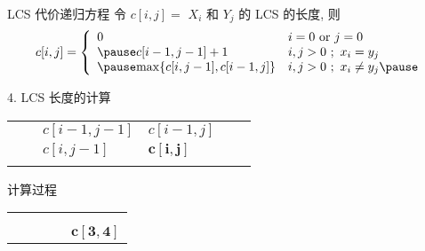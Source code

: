 \documentclass[fontset=fandol,UTF8,fleqn]{beamer}
\begin{document}
\begin{frame}{LCS 代价递归方程}
令 $c[i, j]=$ $X_i$ 和 $Y_j$ 的 LCS 的长度,  则 \pause
\begin{eqnarray*}
  \label{eq:lcs}
  c[i,j]=\left\{\begin{array}{ll}
0 &  i=0\ \textrm{or}\ j=0   \\ \pause
c[i-1,j-1]+1 &  i,j >0\ ;\ x_i=y_j   \\ \pause
\mathrm{max}\{c[i,j-1],c[i-1,j]\} &  i,j >0\
;\ x_i \neq y_j  \pause
\end{array}\right.
\end{eqnarray*}
\end{frame}

\begin{frame}{4. LCS 长度的计算}
\begin{table}
   \centering
   \begin{tabular}{ll|l|l|ll}
&  & & & &  \\
\hline
     &  & $c[i-1, j-1]$ & $c[i-1, j]$  & &     \\
\hline
&    & $c[i, j-1]$ & $\mathbf{c[i,j]}$ &  &   \\
\hline
& &  & &  \\
   \end{tabular}
 \end{table}
\end{frame}

\begin{frame}{计算过程}
\begin{table}
\Large{
  \centering
  \begin{tabular}{c|c|c|c|c}
& & & & \\
\hline
& & & & \\
\hline
& & & & \\
\hline
    \hspace*{1cm} &     \hspace*{1cm} &  \hspace*{1cm}    &    \hspace*{1cm} & $\mathbf{c[3,4]}$  \\ 

  \end{tabular}
}
\end{table}
\end{frame}
\end{document}
